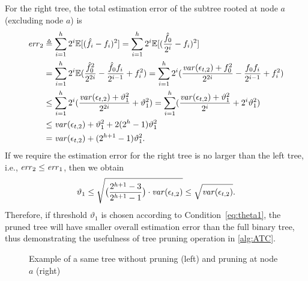 For the right tree, the total estimation error of the subtree rooted at node $a$
(excluding node $a$) is
\begin{align*}
  \mathit{err}_2
  &\triangleq \sum_{i=1}^h 2^i\mathbb{E}[(\hat{f}_i-f_i)^2]
    = \sum_{i=1}^h 2^i\mathbb{E}[(\frac{\hat{f}_0}{2^i}-f_i)^2] \\
  &= \sum_{i=1}^h 2^i\mathbb{E}( \frac{\hat{f}_0^2}{2^{2i}} - \frac{\hat{f}_0f_i}{2^{i-1}}
    +f_i^2 )
  = \sum_{i=1}^h 2^i(\frac{\mathit{var}(\epsilon_{t,2}) + f_0^2}{2^{2i}}
    - \frac{f_0f_i}{2^{i-1}} + f_i^2) \\
  &\leq \sum_{i=1}^h 2^i(\frac{\mathit{var}(\epsilon_{t,2})+\vartheta_1^2}{2^{2i}}+\vartheta_1^2)
    = \sum_{i=1}^h(\frac{\mathit{var}(\epsilon_{t,2})+\vartheta_1^2}{2^i} + 2^i\vartheta_1^2) \\
  &\leq \mathit{var}(\epsilon_{t,2}) + \vartheta_1^2 + 2(2^h-1)\vartheta_1^2 \\
  &= \mathit{var}(\epsilon_{t,2}) + (2^{h+1}-1)\vartheta_1^2.
\end{align*}
If we require the estimation error for the right tree is no larger than the left
tree, i.e., $\mathit{err}_2\le \mathit{err}_1$, then we obtain
\begin{equation}\label{eq:theta1}
  \vartheta_1
  \leq \sqrt{\big(\frac{2^{h+1}-3}{2^{h+1}-1}\big)\cdot\mathit{var}(\epsilon_{t,2})}
  \leq \sqrt{\mathit{var}(\epsilon_{t,2})}.
\end{equation}
Therefore, if threshold $\vartheta_1$ is chosen according to
Condition~\eqref{eq:theta1}, the pruned tree will have smaller overall
estimation error than the full binary tree, thus demonstrating the usefulness of
tree pruning operation in \cref{alg:ATC}.
\begin{figure}[htp]
  \centering
  
  \caption{Example of a same tree without pruning (left) and pruning at node $a$
  (right)}
  \label{fig:branch_of_tree}
\end{figure}